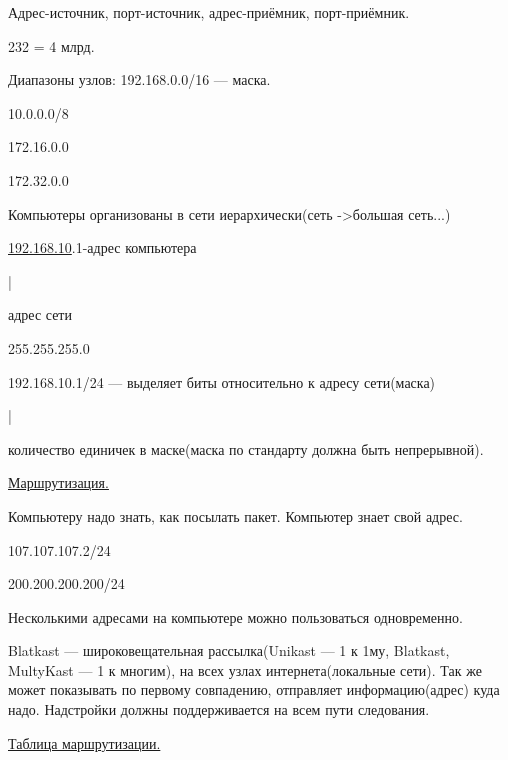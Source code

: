 \par 
Адрес-источник, порт-источник,
адрес-приёмник, порт-приёмник.
\par 232
= 4 млрд.
\par 
Диапазоны узлов: 192.168.0.0/16 — маска.
\par 
                               10.0.0.0/8
\par 
		         172.16.0.0
\par 
		         172.32.0.0
\par 
Компьютеры организованы в сети
иерархически(сеть ->большая сеть...)
\par \underline{192.168.10}.1-адрес
компьютера
\par 
     |
\par 
адрес сети
\par 
255.255.255.0
\par 
192.168.10.1/24 — выделяет биты
относительно к адресу сети(маска)
\par 
                       |
\par 
количество единичек в маске(маска
по стандарту должна быть непрерывной).
\par 


\par 
\underline{Маршрутизация.}
\par 
Компьютеру надо знать, как
посылать пакет. Компьютер знает свой
адрес.
\par 


\par 
107.107.107.2/24
                                                                     
                           200.200.200.200/24
\par 


\par 


\par 


\par 
Несколькими адресами на компьютере
можно пользоваться одновременно.
\par 
Blatkast — широковещательная
рассылка(Unikast — 1 к 1му, Blatkast, MultyKast — 1 к
многим), на всех узлах интернета(локальные
сети). Так же может показывать по первому
совпадению, отправляет информацию(адрес)
куда надо. Надстройки должны поддерживается
на всем пути следования.
\par 
\underline{Таблица маршрутизации.}

	
	
